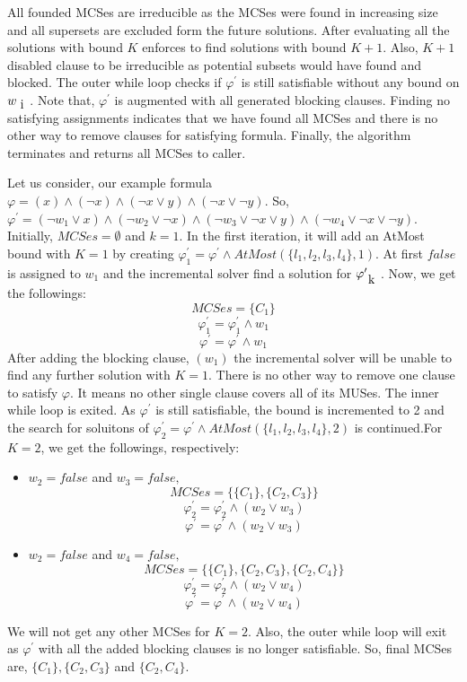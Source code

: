 All founded MCSes are irreducible as the MCSes were found in increasing size and all supersets are excluded form the future solutions. After evaluating all the solutions with bound $K$ enforces to find solutions with bound $K+1$. Also, $K+1$ disabled clause to be irreducible as potential subsets would have found and blocked.\newline
The outer while loop checks if $\varphi^{\prime}$ is still satisfiable without any bound on $w_{\text i}$. Note that, $\varphi^{\prime}$ is augmented with all  generated blocking clauses. Finding no satisfying assignments indicates that we have found all MCSes and there is no other way to remove clauses for satisfying formula. Finally, the algorithm terminates and returns all MCSes to caller.
\begin{example}
Let us consider, our example formula $\varphi=(x)\wedge(\neg x)\wedge(\neg x\vee y)\wedge(\neg x \vee \neg y)$. So, $\varphi^{\prime}=(\neg w_{1}\vee x)\wedge(\neg w_{2}\vee \neg x)\wedge(\neg w_{3}\vee \neg x\vee y)\wedge(\neg w_{4}\vee \neg x \vee \neg y)$. Initially, $MCSes=\emptyset$ and $k=1$.\newline
In the first iteration, it will add an AtMost bound with $K=1$ by creating $\varphi^{\prime}_{1}=\varphi^{\prime} \wedge AtMost(\{l_{1},l_{2},l_{3},l_{4}\},1)$. At first $false$ is assigned to $w_{1}$ and the incremental solver find a solution for $\varphi^{\prime}_{\text k}$. Now, we get the followings:
$$MCSes=\{C_{1}\}$$
$$\varphi^{\prime}_{1}=\varphi^{\prime}_{1} \wedge w_{1}$$
$$\varphi^{\prime}=\varphi^{\prime} \wedge w_{1}$$
After adding the blocking clause, $(w_{1})$ the incremental solver will be unable to find any further solution with $K=1$. There is no other way to remove one clause to satisfy $\varphi$. It means no other single clause covers all of its MUSes. The inner while loop is exited.\newline
As $\varphi^{\prime}$ is still satisfiable, the bound is incremented to 2 and the search for soluitons of $\varphi^{\prime}_{2}=\varphi^{\prime} \wedge AtMost(\{l_{1},l_{2},l_{3},l_{4}\},2)$ is continued.For $K=2$, we get the followings, respectively:
\begin{itemize}
	\item $w_{2}=false$ and $w_{3}=false,$
	$$MCSes=\{\{C_{1}\}, \{C_{2}, C_{3}\}\}$$
	$$\varphi^{\prime}_{2}=\varphi^{\prime}_{2} \wedge (w_{2}\vee w_{3})$$
	$$\varphi^{\prime}=\varphi^{\prime} \wedge (w_{2}\vee w_{3})$$
	\item $w_{2}=false$ and $w_{4}=false,$
	$$MCSes=\{\{C_{1}\}, \{C_{2}, C_{3}\}, \{C_{2}, C_{4}\}\}$$
	$$\varphi^{\prime}_{2}=\varphi^{\prime}_{2} \wedge (w_{2}\vee w_{4})$$
	$$\varphi^{\prime}=\varphi^{\prime} \wedge (w_{2}\vee w_{4})$$
\end{itemize}
We will not get any other MCSes for $K=2$. Also, the outer while loop will exit as $\varphi^{\prime}$ with all the added blocking clauses is no longer satisfiable. So, final MCSes are, $\{C_{1}\}, \{C_{2}, C_{3}\}$ and $\{C_{2}, C_{4}\}$.
\end{example}
